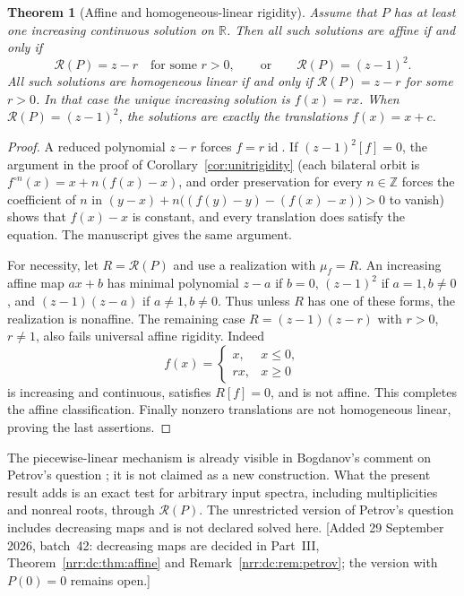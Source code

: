 \documentclass[11pt,letterpaper]{article}
\newtheorem{theorem}{Theorem}[section]
\theoremstyle{definition}
\theoremstyle{remark}
\newcommand{\R}{\mathbb R}
\newcommand{\Z}{\mathbb Z}
\newcommand{\id}{\operatorname{id}}
\newcommand{\itn}[2]{#1^{\circ #2}}
\newcommand{\core}{\mathcal R}
\begin{document}
\begin{theorem}[Affine and homogeneous-linear rigidity]
\label{nrr:sc:thm:rigidity}
Assume that $P$ has at least one increasing continuous solution on $\R$.
Then all such solutions are affine if and only if
\begin{equation}
 \core(P)=z-r\quad\text{for some }r>0,
 \qquad\text{or}\qquad \core(P)=(z-1)^2.
 \label{nrr:sc:eq:affine}
\end{equation}
All such solutions are homogeneous linear if and only if
$\core(P)=z-r$ for some $r>0$.
In that case the unique increasing solution is $f(x)=rx$.
When $\core(P)=(z-1)^2$, the solutions are exactly the translations
$f(x)=x+c$.
\end{theorem}
\begin{proof}
A reduced polynomial $z-r$ forces $f=r\id$.
If $(z-1)^2[f]=0$, the argument in the proof of
Corollary~\ref{cor:unitrigidity} (each bilateral orbit is
$\itn{f}{n}(x)=x+n(f(x)-x)$, and order preservation for every $n\in\Z$
forces the coefficient of $n$ in $(y-x)+n\bigl((f(y)-y)-(f(x)-x)\bigr)>0$ to
vanish) shows that $f(x)-x$ is constant, and every translation does satisfy
the equation. The manuscript gives the same argument.

For necessity, let $R=\core(P)$ and use a realization with $\mu_f=R$.
An increasing affine map $ax+b$ has minimal polynomial
$z-a$ if $b=0$, $(z-1)^2$ if $a=1,b\ne0$, and
$(z-1)(z-a)$ if $a\ne1,b\ne0$.
Thus unless $R$ has one of these forms, the realization is nonaffine.
The remaining case $R=(z-1)(z-r)$ with $r>0$, $r\ne1$, also fails
universal affine rigidity. Indeed
\begin{equation}
 f(x)=\begin{cases}x,&x\le0,\\rx,&x\ge0\end{cases}
 \label{nrr:sc:eq:piecewise-rigidity}
\end{equation}
is increasing and continuous, satisfies $R[f]=0$, and is not affine.
This completes the affine classification.
Finally nonzero translations are not homogeneous linear, proving the
last assertions.
\end{proof}

The piecewise-linear mechanism is already visible in Bogdanov's comment
on Petrov's question \cite{Petrov2016}; it is not claimed as a new
construction. What the present result adds is an exact test for arbitrary
input spectra, including multiplicities and nonreal roots, through
$\core(P)$. The unrestricted version of Petrov's question includes decreasing
maps and is not declared solved here.
[Added 29 September 2026, batch~42: decreasing maps are decided in Part~III,
Theorem~\ref{nrr:dc:thm:affine} and Remark~\ref{nrr:dc:rem:petrov}; the
version with $P(0)=0$ remains open.]
\end{document}
